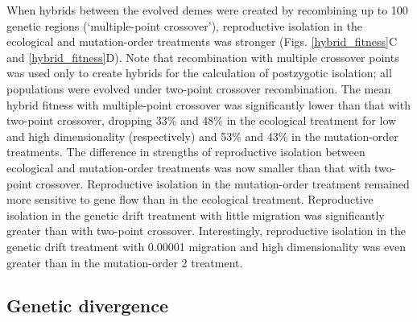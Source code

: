 \begin{doublespace}
When hybrids between the evolved demes
were created by recombining up to 100 genetic regions
(`multiple-point crossover'),
reproductive isolation in the ecological and mutation-order treatments
was stronger (Figs. \ref{hybrid_fitness}C and \ref{hybrid_fitness}D).
%
Note that recombination with multiple crossover points was used only
to create hybrids for the calculation of postzygotic isolation;
all populations were evolved under two-point crossover recombination.
%
The mean hybrid fitness with multiple-point crossover
was significantly lower than that with two-point crossover,
dropping 33\% and 48\% in the ecological treatment
for low and high dimensionality (respectively)
and 53\% and 43\% in the mutation-order treatments.
%
The difference in strengths of reproductive isolation
between ecological and mutation-order treatments
was now smaller than that with two-point crossover.
%
Reproductive isolation in the mutation-order treatment
remained more sensitive to gene flow than in the ecological treatment.
%
Reproductive isolation in the genetic drift treatment with little migration
was significantly greater than with two-point crossover.
%
Interestingly, reproductive isolation in the genetic drift treatment
with 0.00001 migration and high dimensionality
was even greater than in the mutation-order 2 treatment.




\subsection{Genetic divergence}


\end{doublespace}

